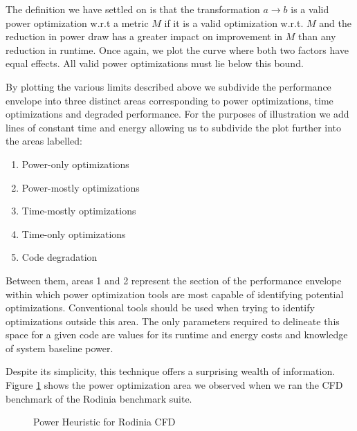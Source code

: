 
The definition we have settled on is that the transformation $a \to b$ is a valid power optimization w.r.t a metric $M$ if it is a valid optimization w.r.t. $M$ and the reduction in power draw has a greater impact on improvement in $M$ than any reduction in runtime. Once again, we plot the curve where both two factors have equal effects. All valid power optimizations must lie below this bound.

By plotting the various limits described above we subdivide the performance envelope into three distinct areas corresponding to power optimizations, time optimizations and degraded performance. For the purposes of illustration we add lines of constant time and energy allowing us to subdivide the plot further into the areas labelled:
\begin{enumerate}
\item Power-only optimizations
\item Power-mostly optimizations
\item Time-mostly optimizations
\item Time-only optimizations
\item Code degradation
\end{enumerate}

Between them, areas 1 and 2 represent the section of the performance envelope within which power optimization tools are most capable of identifying potential optimizations. Conventional tools should be used when trying to identify optimizations outside this area. The only parameters required to delineate this space for a given code are values for its runtime and energy costs and knowledge of system baseline power.

Despite its simplicity, this technique offers a surprising wealth of information. Figure \ref{fig:modelpoints} shows the power optimization area we observed when we ran the CFD benchmark of the Rodinia benchmark suite.


\begin{figure}
\label{fig:modelpoints}

\caption{Power Heuristic for Rodinia CFD}
\end{figure}

	
	
